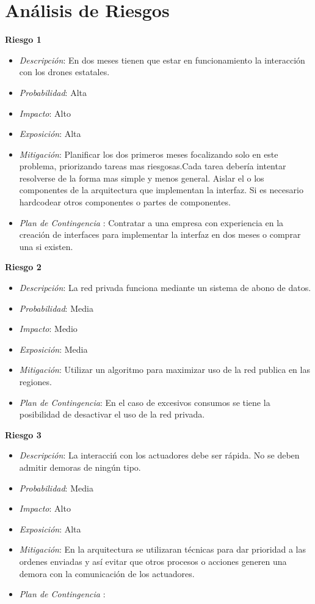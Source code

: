 \section{Análisis de Riesgos}


\textbf{Riesgo 1}
\begin{itemize}
\item \textsl{Descripci\'on}: En dos meses tienen que estar en funcionamiento la interacción con los drones estatales.
 \item \textsl{Probabilidad}: Alta
 \item \textsl{Impacto}: Alto
 \item \textsl{Exposición}: Alta
 \item \textsl{Mitigación}: Planificar los dos primeros meses focalizando solo en este problema, priorizando tareas mas riesgosas.Cada tarea deber\'ia intentar resolverse de la forma mas simple y menos general. Aislar el o los  componentes de la arquitectura que implementan la interfaz. Si es necesario hardcodear otros componentes o partes de componentes.
 \item \textsl{Plan de Contingencia} : Contratar a una empresa con experiencia en la creaci\'on de interfaces para implementar la interfaz en dos meses o comprar una si existen.
 \end{itemize}


 \textbf{Riesgo 2}
\begin{itemize}
 \item \textsl{Descripci\'on}: La red privada funciona mediante un sistema de abono de datos.
 \item \textsl{Probabilidad}: Media
 \item \textsl{Impacto}: Medio
 \item \textsl{Exposición}: Media
 \item \textsl{Mitigación}: Utilizar un algoritmo para maximizar uso de la red publica en las regiones.
 \item \textsl{Plan de Contingencia}: En el caso de excesivos consumos se tiene la posibilidad de desactivar el uso de la red privada.
\end{itemize}

 
\textbf{Riesgo 3}
\begin{itemize}
 \item \textsl{Descripci\'on}: La interacci\'n con los actuadores debe ser r\'apida. No se deben admitir demoras de ning\'un tipo.
 \item \textsl{Probabilidad}: Media 
 \item \textsl{Impacto}: Alto
 \item \textsl{Exposición}: Alta
 \item \textsl{Mitigación}: En la arquitectura se utilizaran t\'ecnicas para dar prioridad a las ordenes enviadas y as\'i evitar que otros procesos o acciones generen una demora con la comunicaci\'on de los actuadores.
 \item \textsl{Plan de Contingencia} : 
\end{itemize}

